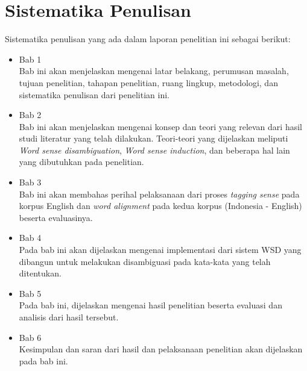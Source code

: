 \section{Sistematika Penulisan}
Sistematika penulisan yang ada dalam laporan penelitian ini sebagai berikut:
\begin{itemize}
	
	\item Bab 1 \babSatu \\
	Bab ini akan menjelaskan mengenai latar belakang, perumusan masalah, tujuan penelitian, tahapan penelitian, ruang lingkup, metodologi, dan sistematika penulisan dari penelitian ini.
	
	\item Bab 2 \babDua \\
	Bab ini akan menjelaskan mengenai konsep dan teori yang relevan dari hasil studi literatur yang telah dilakukan. Teori-teori yang dijelaskan meliputi \textit{Word sense disambiguation}, \textit{Word sense induction}, dan beberapa hal lain yang dibutuhkan pada penelitian.
	
	\item Bab 3 \babTiga \\
	Bab ini akan membahas perihal pelaksanaan dari proses \textit{tagging sense} pada korpus English dan \textit{word alignment} pada kedua korpus (Indonesia - English) beserta evaluasinya.
	
	\item Bab 4 \babEmpat \\
	Pada bab ini akan dijelaskan mengenai implementasi dari sistem WSD yang dibangun untuk melakukan disambiguasi pada kata-kata yang telah ditentukan.
	
	\item Bab 5 \babLima \\
	Pada bab ini, dijelaskan mengenai hasil penelitian beserta evaluasi dan analisis dari hasil tersebut. 
	
	\item Bab 6 \babEnam \\
	Kesimpulan dan saran dari hasil dan pelaksanaan penelitian akan dijelaskan pada bab ini.
	
\end{itemize}